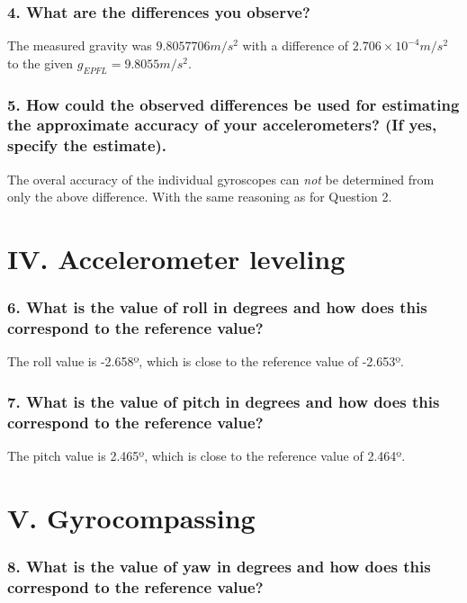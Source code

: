 \documentclass{article}
\newcommand{\e}[1]{\times 10^{#1}} %
\begin{document}
\subsubsection*{4. What are the differences you observe?}

The measured gravity was $9.8057706 \si{m/s^2}$ with a difference of $2.706\e{-4} \si{m/s^2}$ to the given $g_{EPFL} = 9.8055 \si{m/s^2}$.

\subsubsection*{5. How could the observed differences be used for estimating the approximate
accuracy of your accelerometers? (If yes, specify the estimate).}

The overal accuracy of the individual gyroscopes can \textit{not} be determined from only the above difference.
With the same reasoning as for Question 2.

\section*{IV. Accelerometer leveling}

\subsubsection*{6. What is the value of roll in degrees and how does this correspond to the reference value?}

The roll value is -2.658º, which is close to the reference value of -2.653º.

\subsubsection*{7. What is the value of pitch in degrees and how does this correspond to the reference value?}

The pitch value is 2.465º, which is close to the reference value of 2.464º.


\section*{V. Gyrocompassing}

\subsubsection*{8. What is the value of yaw in degrees and how does this correspond to the reference value?}
\end{document}
